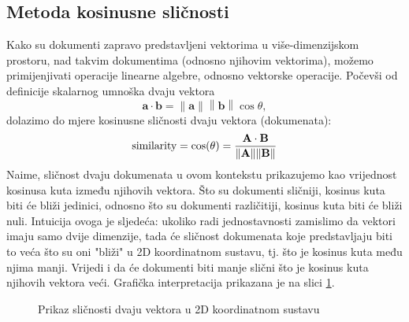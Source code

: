 \documentclass[times, utf8, zavrsni]{fer}
\begin{document}
\subsection{Metoda kosinusne sličnosti}
Kako su dokumenti zapravo predstavljeni vektorima u više-dimenzijskom prostoru, nad takvim dokumentima (odnosno njihovim vektorima), možemo primijenjivati operacije linearne algebre, odnosno vektorske operacije. Počevši od definicije skalarnog umnoška dvaju vektora
\begin{equation}
\mathbf {a} \cdot \mathbf {b} =\left\|\mathbf {a} \right\|\left\|\mathbf {b} \right\|\cos \theta,
\end{equation}
dolazimo do mjere kosinusne sličnosti dvaju vektora (dokumenata):
\begin{equation}
{\text{similarity}}=\cos(\theta )={\mathbf {A} \cdot \mathbf {B}  \over \|\mathbf {A} \|\|\mathbf {B}\|}
\end{equation}
Naime, sličnost dvaju dokumenata u ovom kontekstu prikazujemo kao vrijednost kosinusa kuta između njihovih vektora. Što su dokumenti sličniji, kosinus kuta biti će bliži jedinici, odnosno što su dokumenti različitiji, kosinus kuta biti će bliži nuli. Intuicija ovoga je sljedeća: ukoliko radi jednostavnosti zamislimo da vektori imaju samo dvije dimenzije, tada će sličnost dokumenata koje predstavljaju biti to veća što su oni "bliži" u 2D koordinatnom sustavu, tj. što je kosinus kuta među njima manji. Vrijedi i da će dokumenti biti manje slični što je kosinus kuta njihovih vektora veći. Grafička interpretacija prikazana je na slici
\ref{fig:vectors}.

\begin{figure}
\caption{Prikaz sličnosti dvaju vektora u 2D koordinatnom sustavu}
\label{fig:vectors}
\end{figure}
\end{document}

